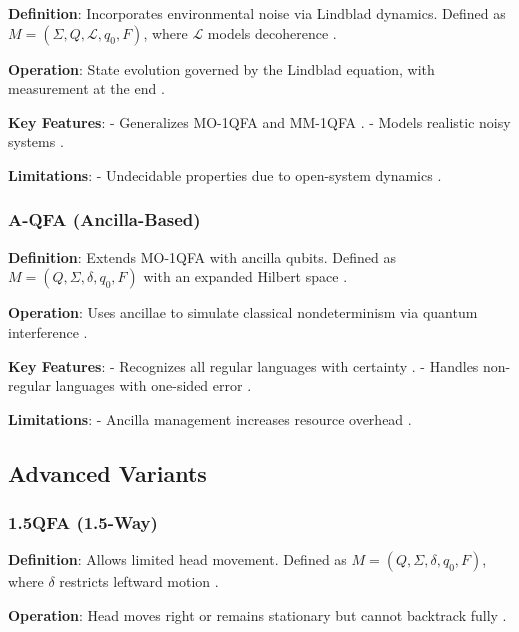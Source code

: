 \textbf{Definition}: Incorporates environmental noise via Lindblad dynamics. Defined as \( M = (\Sigma, Q, \mathcal{L}, q_0, F) \), where \( \mathcal{L} \) models decoherence \cite{hirvensalo2012quantum}.

\textbf{Operation}: State evolution governed by the Lindblad equation, with measurement at the end \cite{hirvensalo2012quantum}.

\textbf{Key Features}:
- Generalizes MO-1QFA and MM-1QFA \cite{hirvensalo2012quantum}.
- Models realistic noisy systems \cite{breuer2002theory}.

\textbf{Limitations}: 
- Undecidable properties due to open-system dynamics \cite{hirvensalo2012quantum}.

\subsubsection{A-QFA (Ancilla-Based)}
\label{sssec:a-qfa}

\textbf{Definition}: Extends MO-1QFA with ancilla qubits. Defined as \( M = (Q, \Sigma, \delta, q_0, F) \) with an expanded Hilbert space \cite{paschen2000quantum}.

\textbf{Operation}: Uses ancillae to simulate classical nondeterminism via quantum interference \cite{paschen2000quantum}.

\textbf{Key Features}:
- Recognizes all regular languages with certainty \cite{paschen2000quantum}.
- Handles non-regular languages with one-sided error \cite{paschen2000quantum}.

\textbf{Limitations}: 
- Ancilla management increases resource overhead \cite{paschen2000quantum}.

\subsection{Advanced Variants}
\label{subsec:advanced-variants}

\subsubsection{1.5QFA (1.5-Way)}
\label{sssec:1.5qfa}

\textbf{Definition}: Allows limited head movement. Defined as \( M = (Q, \Sigma, \delta, q_0, F) \), where \( \delta \) restricts leftward motion \cite{kondacs1997power}.

\textbf{Operation}: Head moves right or remains stationary but cannot backtrack fully \cite{kondacs1997power}.

